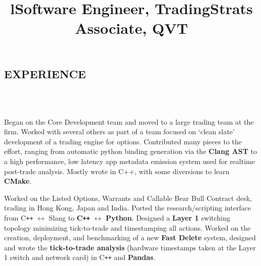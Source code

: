 \documentclass{res}
\begin{document}
 

\address{\\{\bf PRESENT ADDRESS}\\123 N Desplaines St, Apt 1611\\Chicago, IL 60661\\+1 (630) 450-5725}
\address{\\{\bf PERMANENT ADDRESS}\\2558 Breckenridge Ct.\\Aurora, IL 60504 }


\begin{resume}

\section{EXPERIENCE}
\begin{format}
  \title{l}  \\
  \body\\
\end{format}

\title{\bf Software Engineer, Trading}
\begin{position}
	Began on the Core Development team and moved to a large trading team at the firm. Worked with several others as part of a team focused on `clean slate' development of a trading engine for options. Contributed many pieces to the effort, ranging from automatic python binding generation via the {\bf Clang AST} to a high performance, low latency app metadata emission system used for realtime post-trade analysis. Mostly wrote in C++, with some diversions to learn {\bf CMake}.
\end{position}

\title{\bf Strats Associate, QVT}
\begin{position}
	Worked on the Listed Options, Warrants and Callable Bear Bull Contract desk, trading in Hong Kong, Japan and India. Ported the research/scripting interface from C\texttt{++} $\leftrightarrow$ Slang to {\bf C\texttt{++}} $\leftrightarrow$ {\bf Python}. Designed a {\bf Layer 1} switching topology minimizing tick-to-trade and timestamping all actions. Worked on the creation, deployment, and benchmarking of a new {\bf Fast Delete} system, designed and wrote the {\bf tick-to-trade analysis} (hardware timestamps taken at the Layer 1 switch and network card) in C\texttt{++} and {\bf Pandas}.
\end{position}


\end{resume}
\end{document}
